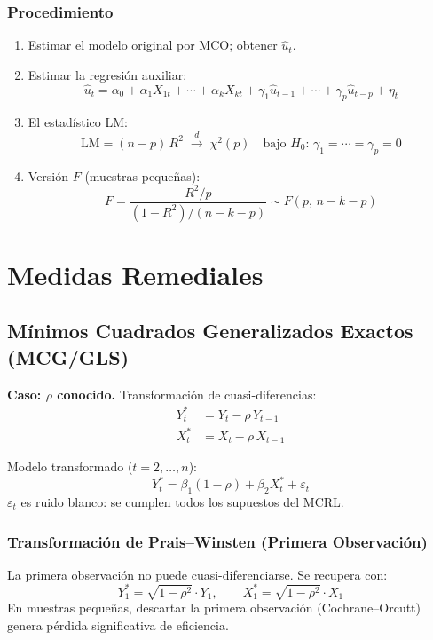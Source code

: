 \documentclass[11pt, letterpaper]{article}
\begin{document}
\subsubsection{Procedimiento}
\begin{enumerate}
  \item Estimar el modelo original por MCO; obtener $\hat{u}_t$.
  \item Estimar la regresi\'on auxiliar:
  \[
    \hat{u}_t = \alpha_0 + \alpha_1 X_{1t} + \cdots + \alpha_k X_{kt}
                + \gamma_1 \hat{u}_{t-1} + \cdots + \gamma_p \hat{u}_{t-p}
                + \eta_t
  \]
  \item El estad\'istico LM:
  \[
    \text{LM} = (n-p)\,R^2 \;\xrightarrow{d}\; \chi^2(p)
    \quad\text{bajo }H_0:\,\gamma_1=\cdots=\gamma_p=0
  \]
  \item Versi\'on $F$ (muestras peque\~nas):
  \[
    F = \frac{R^2/p}{(1-R^2)/(n-k-p)} \sim F(p,\, n-k-p)
  \]
\end{enumerate}

\section{Medidas Remediales}

\subsection{M\'inimos Cuadrados Generalizados Exactos (MCG/GLS)}

\textbf{Caso: $\rho$ conocido.}
Transformaci\'on de cuasi-diferencias:
\begin{align*}
  Y_t^* &= Y_t - \rho\,Y_{t-1} \\
  X_t^* &= X_t - \rho\,X_{t-1}
\end{align*}

Modelo transformado ($t=2,\ldots,n$):
\[
  Y_t^* = \beta_1(1-\rho) + \beta_2 X_t^* + \varepsilon_t
\]
$\varepsilon_t$ es ruido blanco: se cumplen todos los supuestos del MCRL.

\subsubsection{Transformaci\'on de Prais--Winsten (Primera Observaci\'on)}

La primera observaci\'on no puede cuasi-diferenciarse. Se recupera con:
\[
  Y_1^* = \sqrt{1-\rho^2}\cdot Y_1, \qquad
  X_1^* = \sqrt{1-\rho^2}\cdot X_1
\]
En muestras peque\~nas, descartar la primera observaci\'on (Cochrane--Orcutt)
genera p\'erdida significativa de eficiencia.
\end{document}
